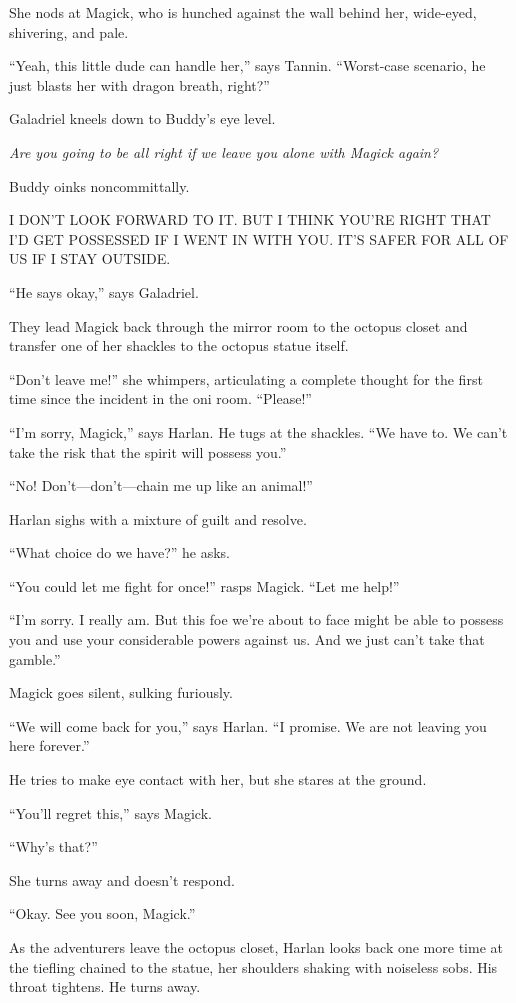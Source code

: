 \documentclass[smalldemyvopaper,11pt,twoside,onecolumn,openright,extrafontsizes]{memoir}
\begin{document}
She nods at Magick, who is hunched against the wall behind her,
wide-eyed, shivering, and pale.

``Yeah, this little dude can handle her,'' says Tannin. ``Worst-case
scenario, he just blasts her with dragon breath, right?''

Galadriel kneels down to Buddy's eye level.

\emph{Are you going to be all right if we leave you alone with Magick
again?}

Buddy oinks noncommittally.

I DON'T LOOK FORWARD TO IT. BUT I THINK YOU'RE RIGHT THAT I'D GET
POSSESSED IF I WENT IN WITH YOU. IT'S SAFER FOR ALL OF US IF I STAY
OUTSIDE.

``He says okay,'' says Galadriel.

They lead Magick back through the mirror room to the octopus closet and
transfer one of her shackles to the octopus statue itself.

``Don't leave me!'' she whimpers, articulating a complete thought for
the first time since the incident in the oni room. ``Please!''

``I'm sorry, Magick,'' says Harlan. He tugs at the shackles. ``We have
to. We can't take the risk that the spirit will possess you.''

``No! Don't---don't---chain me up like an animal!''

Harlan sighs with a mixture of guilt and resolve.

``What choice do we have?'' he asks.

``You could let me fight for once!'' rasps Magick. ``Let me help!''

``I'm sorry. I really am. But this foe we're about to face might be able
to possess you and use your considerable powers against us. And we just
can't take that gamble.''

Magick goes silent, sulking furiously.

``We will come back for you,'' says Harlan. ``I promise. We are not
leaving you here forever.''

He tries to make eye contact with her, but she stares at the ground.

``You'll regret this,'' says Magick.

``Why's that?''

She turns away and doesn't respond.

``Okay. See you soon, Magick.''

As the adventurers leave the octopus closet, Harlan looks back one more
time at the tiefling chained to the statue, her shoulders shaking with
noiseless sobs. His throat tightens. He turns away.
\end{document}
